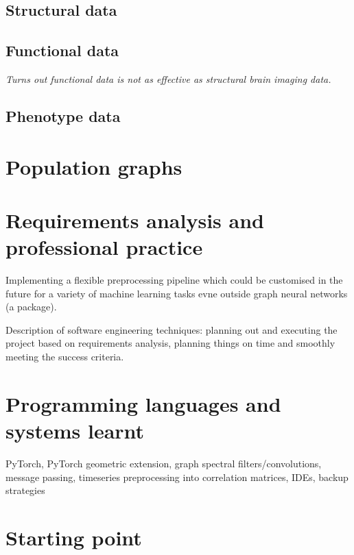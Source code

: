 \documentclass[12pt,a4paper,twoside, openright, hidelinks]{report}
\begin{document}
\subsection{Structural data}

\subsection{Functional data}
\textit{Turns out functional data is not as effective as structural brain imaging data.}

\subsection{Phenotype data}

\section{Population graphs}

\section{Requirements analysis and professional practice}

Implementing a flexible preprocessing pipeline which could be customised in the future for a variety of machine learning tasks evne outside graph neural networks (a package).

Description of software engineering techniques: planning out and executing the project based on requirements analysis, planning things on time and smoothly meeting the success criteria.

\section{Programming languages and systems learnt}
PyTorch, PyTorch geometric extension, graph spectral filters/convolutions, message passing, timeseries preprocessing into correlation matrices, IDEs, backup strategies

\section{Starting point}
\end{document}
